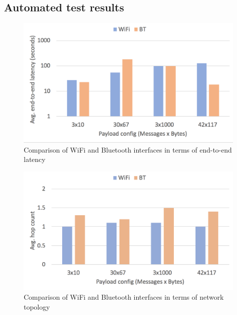 \documentclass[conference]{IEEEtran}
\begin{document}
%
\subsection{Automated test results}
\label{sec:automated}
%
\begin{figure}[htbp]
\centerline{\includegraphics[width=\columnwidth]{figs/variety_e2e_latency}}
\caption{Comparison of WiFi and Bluetooth interfaces in terms of
  end-to-end latency}
\label{fig:variety_e2e}
\end{figure}

\begin{figure}[htbp]
\centerline{\includegraphics[width=\columnwidth]{figs/variety_hops}}
\caption{Comparison of WiFi and Bluetooth interfaces in terms of
  network topology}
\label{fig:variety_hops}
\end{figure}
\end{document}
